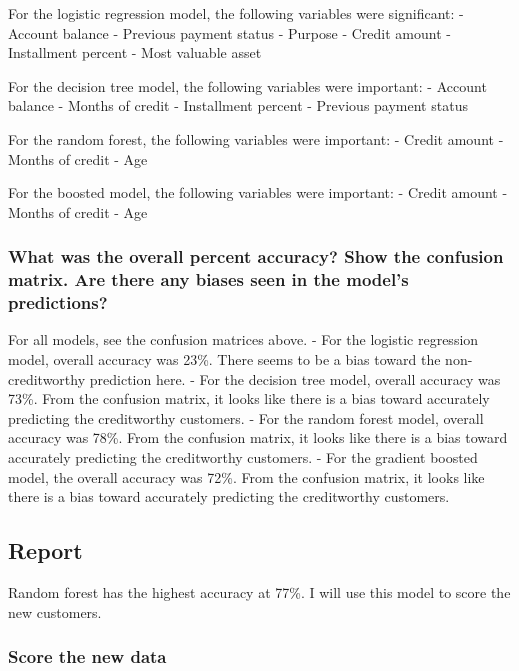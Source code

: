 \documentclass[11pt]{article}
\begin{document}
    For the logistic regression model, the following variables were
significant: - Account balance - Previous payment status - Purpose -
Credit amount - Installment percent - Most valuable asset

For the decision tree model, the following variables were important: -
Account balance - Months of credit - Installment percent - Previous
payment status

For the random forest, the following variables were important: - Credit
amount - Months of credit - Age

For the boosted model, the following variables were important: - Credit
amount - Months of credit - Age

    \subsubsection{What was the overall percent accuracy? Show the confusion
matrix. Are there any biases seen in the model's
predictions?}\label{what-was-the-overall-percent-accuracy-show-the-confusion-matrix.-are-there-any-biases-seen-in-the-models-predictions}

For all models, see the confusion matrices above. - For the logistic
regression model, overall accuracy was 23\%. There seems to be a bias
toward the non-creditworthy prediction here. - For the decision tree
model, overall accuracy was 73\%. From the confusion matrix, it looks
like there is a bias toward accurately predicting the creditworthy
customers. - For the random forest model, overall accuracy was 78\%.
From the confusion matrix, it looks like there is a bias toward
accurately predicting the creditworthy customers. - For the gradient
boosted model, the overall accuracy was 72\%. From the confusion matrix,
it looks like there is a bias toward accurately predicting the
creditworthy customers.

    \subsection{Report}\label{report}

    Random forest has the highest accuracy at 77\%. I will use this model to
score the new customers.

    \subsubsection{Score the new data}\label{score-the-new-data}
\end{document}
